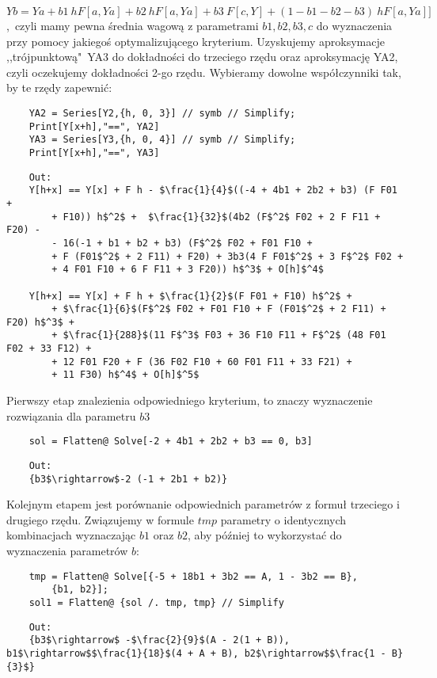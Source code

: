 $Yb = Ya + b1~h F[a,Ya]+ b2~h F[a,Ya] + b3~F[c,Y] + (1 - b1 - b2 - b3)~h F[a,Ya]]$,~czyli mamy pewna średnia wagową z parametrami $b1, b2, b3, c$  do wyznaczenia przy pomocy jakiegoś optymalizującego kryterium. Uzyskujemy aproksymacje ,,trójpunktową"~YA3 do dokładności do trzeciego rzędu oraz aproksymację YA2, czyli oczekujemy dokładności 2-go rzędu.  Wybieramy dowolne współczynniki tak, by te rzędy zapewnić:
\begin{lstlisting}
    YA2 = Series[Y2,{h, 0, 3}] // symb // Simplify;
    Print[Y[x+h],"==", YA2]
    YA3 = Series[Y3,{h, 0, 4}] // symb // Simplify;
    Print[Y[x+h],"==", YA3]
\end{lstlisting}
\begin{lstlisting}
    Out:
    Y[h+x] == Y[x] + F h - $\frac{1}{4}$((-4 + 4b1 + 2b2 + b3) (F F01 +
        + F10)) h$^2$ +  $\frac{1}{32}$(4b2 (F$^2$ F02 + 2 F F11 + F20) -
        - 16(-1 + b1 + b2 + b3) (F$^2$ F02 + F01 F10 +
        + F (F01$^2$ + 2 F11) + F20) + 3b3(4 F F01$^2$ + 3 F$^2$ F02 + 
        + 4 F01 F10 + 6 F F11 + 3 F20)) h$^3$ + O[h]$^4$
    
    Y[h+x] == Y[x] + F h + $\frac{1}{2}$(F F01 + F10) h$^2$ +
        + $\frac{1}{6}$(F$^2$ F02 + F01 F10 + F (F01$^2$ + 2 F11) + F20) h$^3$ +
        + $\frac{1}{288}$(11 F$^3$ F03 + 36 F10 F11 + F$^2$ (48 F01 F02 + 33 F12) +
        + 12 F01 F20 + F (36 F02 F10 + 60 F01 F11 + 33 F21) +
        + 11 F30) h$^4$ + O[h]$^5$
\end{lstlisting}
Pierwszy etap znalezienia odpowiedniego kryterium, to znaczy wyznaczenie rozwiązania dla parametru $b3$
\begin{lstlisting}
    sol = Flatten@ Solve[-2 + 4b1 + 2b2 + b3 == 0, b3]
\end{lstlisting}
\begin{lstlisting}
    Out:
    {b3$\rightarrow$-2 (-1 + 2b1 + b2)}
\end{lstlisting}
Kolejnym etapem jest porównanie odpowiednich parametrów z formuł trzeciego i drugiego rzędu. Związujemy w formule $tmp$ parametry o identycznych kombinacjach wyznaczając $b1$ oraz $b2$, aby później to wykorzystać do wyznaczenia parametrów $b$:
\begin{lstlisting}
    tmp = Flatten@ Solve[{-5 + 18b1 + 3b2 == A, 1 - 3b2 == B},
        {b1, b2}];
    sol1 = Flatten@ {sol /. tmp, tmp} // Simplify
\end{lstlisting}
\begin{lstlisting}
    Out:
    {b3$\rightarrow$ -$\frac{2}{9}$(A - 2(1 + B)), b1$\rightarrow$$\frac{1}{18}$(4 + A + B), b2$\rightarrow$$\frac{1 - B}{3}$}
\end{lstlisting}
